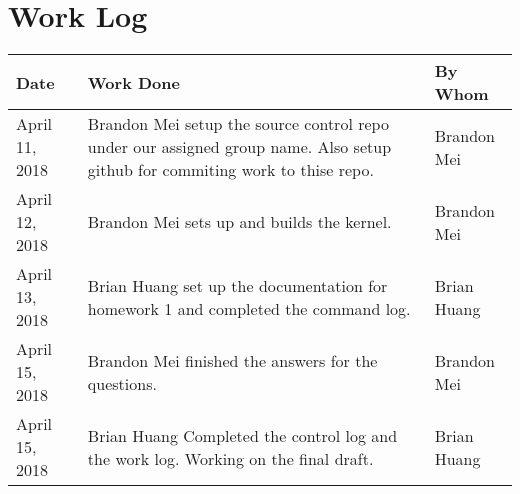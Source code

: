 \documentclass[onecolumn, draftclsnofoot, 10pt, titlepage, compsoc]{IEEEtran}
\begin{document}
\section *{Work Log}
\begin{tabular}{ | p{5cm} | p{5cm} | p{5cm} | }
	\hline
	Date & Work Done & By Whom \\
	\hline
	\hline
	April 11, 2018 & Brandon Mei setup the source control repo under our assigned group name. Also setup github for commiting work to thise repo. & Brandon Mei \\
	\hline
	April 12, 2018 & Brandon Mei sets up and builds the kernel. & Brandon Mei \\
	\hline
	April 13, 2018 & Brian Huang set up the documentation for homework 1 and completed the command log. & Brian Huang \\
	\hline
	April 15, 2018 & Brandon Mei finished the answers for the questions. & Brandon Mei \\
	\hline
	April 15, 2018 & Brian Huang Completed the control log and the work log. Working on the final draft. & Brian Huang \\
	\hline
\end{tabular}


\nocite{*}


\end{document}
